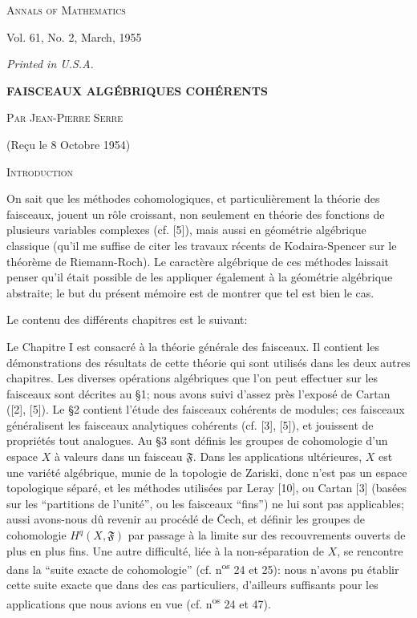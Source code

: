 


\textsc{Annals of Mathematics}


Vol. 61, No. 2, March, 1955


\textit{Printed in U.S.A.}


\textbf{FAISCEAUX ALGÉBRIQUES COHÉRENTS}


\textsc{Par Jean-Pierre Serre}


(Reçu le 8 Octobre 1954)


\textsc{Introduction}

On sait que les méthodes cohomologiques, et particulièrement la théorie des faisceaux, jouent un rôle croissant, non seulement en théorie des fonctions de plusieurs variables complexes (cf. [5]), mais aussi en géométrie algébrique classique (qu'il me suffise de citer les travaux récents de Kodaira-Spencer sur le théorème de Riemann-Roch). Le caractère algébrique de ces méthodes laissait penser qu'il était possible de les appliquer également à la géométrie algébrique abstraite; le but du présent mémoire est de montrer que tel est bien le cas.

Le contenu des différents chapitres est le suivant:

Le Chapitre I est consacré à la théorie générale des faisceaux. Il contient les démonstrations des résultats de cette théorie qui sont utilisés dans les deux autres chapitres. Les diverses opérations algébriques que l'on peut effectuer sur les faisceaux sont décrites au \S1; nous avons suivi d'assez près l'exposé de Cartan ([2], [5]). Le \S2 contient l'étude des faisceaux cohérents de modules; ces faisceaux généralisent les faisceaux analytiques cohérents (cf. [3], [5]), et jouissent de propriétés tout analogues. Au \S3 sont définis les groupes de cohomologie d'un espace $X$ à valeurs dans un faisceau $\mathfrak{F}$. Dans les applications ultérieures, $X$ est une variété algébrique, munie de la topologie de Zariski, donc n'est pas un espace topologique séparé, et les méthodes utilisées par Leray [10], ou Cartan [3] (basées sur les ``partitions de l'unité'', ou les faisceaux ``fins'') ne lui sont pas applicables; aussi avons-nous dû revenir au procédé de \v{C}ech, et définir les groupes de cohomologie $H^q(X, \mathfrak{F})$ par passage à la limite sur des recouvrements ouverts de plus en plus fins. Une autre difficulté, liée à la non-séparation de $X$, se rencontre dans la ``suite exacte de cohomologie'' (cf. n\textsuperscript{os} 24 et 25): nous n'avons pu établir cette suite exacte que dans des cas particuliers, d'ailleurs suffisants pour les applications que nous avions en vue (cf. n\textsuperscript{os} 24 et 47).

